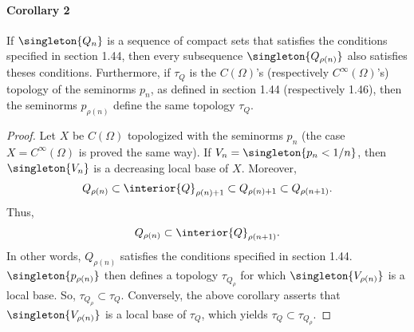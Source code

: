 \paragraph{Corollary 2}
If 
%
  $\singleton{Q_n}$ 
%
is a sequence of compact sets that satisfies the conditions specified 
in section 1.44, then every subsequence 
%
  $\singleton{Q_{\rho(n)}}$ 
%
also satisfies theses conditions.
%
Furthermore, if $\tau_{Q}$ is the $C(\Omega)$'s 
(respectively $C^\infty (\Omega)$'s) topology of the seminorms $p_{n}$, 
as defined in section 1.44 (respectively 1.46), then the seminorms 
%
  $p_{\rho(n)}$ 
%
define the same topology $\tau_{Q}$.
%
\begin{proof}%
%
Let $X$ be $C(\Omega)$ topologized with the seminorms $p_{n}$ 
(the case $X=C^\infty(\Omega)$ is proved the same way).
%
If 
    $V_{n} = \singleton{p_{n} < 1/n}$, 
then 
    $\singleton{V_{n}}$ 
is a decreasing local base of $X$.
%
Moreover,
% 
  \begin{align}
    Q_{\rho(n)} 
      \subset 
    \interior{Q}_{\rho(n) + 1} 
      \subset 
    Q_{\rho(n) + 1} 
      \subset 
    Q_{\rho(n+ 1)}.
  \end{align}
% 
Thus,
%
  \begin{align}
    Q_{\rho(n)} 
      \subset 
    \interior{Q}_{\rho(n+ 1)}.
  \end{align}
%
In other words, 
%
  $Q_{\rho(n)}$ satisfies the conditions specified in section 1.44.
%
%
  $\singleton{p_{\rho(n)}}$
% 
then defines a topology $\tau_{Q_\rho}$ for which  
% 
  $\singleton{V_{\rho(n)}}$ 
%
is a local base. So, 
% 
  $\tau_{Q_\rho} \subset \tau_{Q}$.
%
Conversely, the above corollary asserts that 
%
  $\singleton{V_{\rho(n)}}$ 
%
is a local base of $\tau_{Q}$, which yields  
%
  $\tau_{Q}\subset \tau_{Q_\rho}$.
%
\end{proof}
